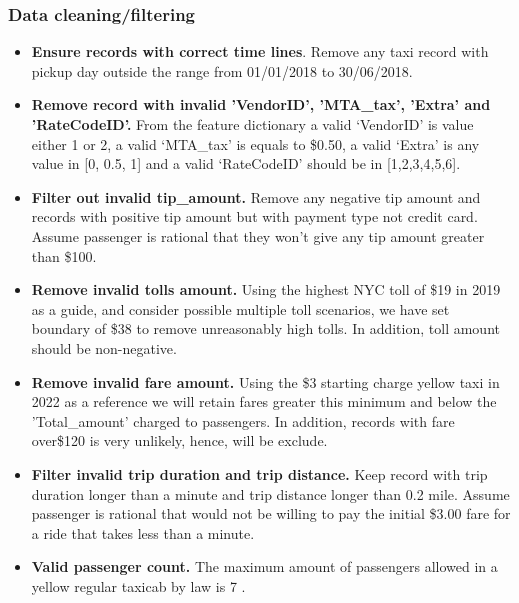 \documentclass[11pt]{article}
\begin{document}
        \subsubsection{Data cleaning/filtering}
        \begin{itemize}
            \item \textbf{Ensure records with correct time lines}. Remove any taxi record  with pickup day outside the range from 01/01/2018 to 30/06/2018.

            
            \item \textbf{Remove record with invalid 'VendorID', 'MTA\_tax', 'Extra' and 'RateCodeID'.} From the feature dictionary a valid ‘VendorID’ is value either 1 or 2, a valid ‘MTA\_tax’ is equals to \$0.50, a valid ‘Extra’ is any value in [0, 0.5, 1] and a valid ‘RateCodeID’ should be in [1,2,3,4,5,6]. 
            
            \item \textbf{Filter out invalid tip\_amount.} Remove any negative tip amount and records with positive tip amount but with payment type not credit card. 
            Assume passenger is rational that they won't give any tip amount greater than \$100. 
            
            \item \textbf{Remove invalid tolls amount.} Using the highest NYC toll of \$19 \cite{most_expensive_toll} in 2019 as a guide, and consider possible multiple toll scenarios, we have set boundary of \$38 to remove unreasonably high tolls. In addition, toll amount should be non-negative.

            \item \textbf{Remove invalid fare amount.} Using the \$3 starting charge yellow taxi in 2022\cite{start_fare} as a reference we will retain fares greater this minimum and below the 'Total\_amount' charged to passengers.
            In addition, records with fare over\$120 is very unlikely\cite{fare}, hence, will be exclude.
   

            \item \textbf{Filter invalid trip duration and trip distance.} Keep record with trip duration longer than a minute and trip distance longer than 0.2 mile. Assume passenger is rational that would not be willing to pay the initial \$3.00 fare for a ride that takes less than a minute.

            \item \textbf{Valid passenger count.} The maximum amount of passengers allowed in a yellow regular taxicab by law is 7 \cite{passenger_capacity}.


\end{itemize}
\end{document}
